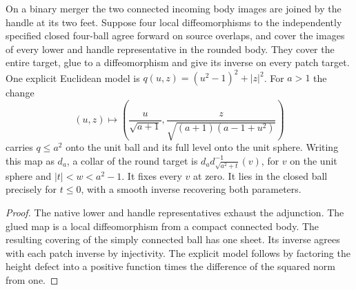 \begin{theorem}
\label{thm:ed03-target-ball-cover}
\leanok
On a binary merger the two connected incoming body images are joined by
the handle at its two feet. Suppose four local diffeomorphisms to the
independently specified closed four-ball agree forward on source overlaps,
and cover the images of every lower and handle representative in the
rounded body. They cover the entire target, glue to a diffeomorphism and
give its inverse on every patch target. One explicit Euclidean model is
$q(u,z)=(u^2-1)^2+|z|^2$. For $a>1$ the change
\[
 (u,z)\longmapsto
 \left(\frac{u}{\sqrt{a+1}},
      \frac{z}{\sqrt{(a+1)(a-1+u^2)}}\right)
\]
carries $q\le a^2$ onto the unit ball and its full level onto the unit sphere.
Writing this map as $d_a$, a collar of the round target is
$d_a d_{\sqrt{a^2+t}}^{-1}(v)$, for $v$ on the unit sphere and
$|t|<w<a^2-1$. It fixes every $v$ at zero. It lies in the closed ball
precisely for $t\le0$, with a smooth inverse recovering both parameters.
\end{theorem}
\begin{proof}
\leanok
The native lower and handle representatives exhaust the adjunction.
The glued map is a local diffeomorphism from a compact connected body.
The resulting covering of the simply connected ball has one sheet.
Its inverse agrees with each patch inverse by injectivity. The explicit
model follows by factoring the height defect into a positive function
times the difference of the squared norm from one.
\end{proof}

